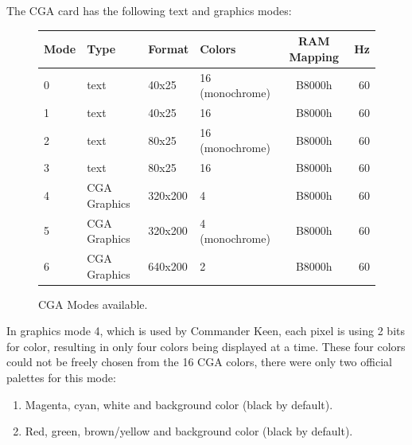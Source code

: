 \documentclass[book.tex]{subfiles}
\begin{document}
The CGA card has the following text and graphics modes:\\
\vspace{-10pt}
\begin{figure}[H]
\centering
\begin{table}[H]
\begin{tabularx}{\textwidth}[c]{llllcr}
\hline
\textbf{Mode} & \textbf{Type} & \textbf{Format} & \textbf{Colors} & \hspace{10pt}\textbf{RAM Mapping}\hspace{10pt} & \textbf{Hz}        \\ \hline
0             & text          & 40x25           & 16 (monochrome) & B8000h     & 60                           \\ \hline
1             & text          & 40x25           & 16              & B8000h    & 60                            \\ \hline
2             & text          & 80x25           & 16 (monochrome) & B8000h    & 60                            \\ \hline
3             & text          & 80x25           & 16              & B8000h    & 60                            \\ \hline
4             & CGA Graphics  & 320x200         & 4               & B8000h    & 60                            \\ \hline
5             & CGA Graphics  & 320x200         & 4 (monochrome)  & B8000h    & 60                            \\ \hline
6             & CGA Graphics  & 640x200         & 2               & B8000h    & 60                            \\ \hline

\end{tabularx}
\end{table}
\caption{CGA Modes available.}
\label{ega-modes-available}
 \end{figure} 

In graphics mode 4, which is used by Commander Keen, each pixel is using 2 bits for color, resulting in only four colors being displayed at a time. These four colors could not be freely chosen from the 16 CGA colors, there were only two official palettes for this mode:
\begin{enumerate}
  \item Magenta, cyan, white and background color (black by default).
  \item Red, green, brown/yellow and background color (black by default).
\end{enumerate}
\end{document}
